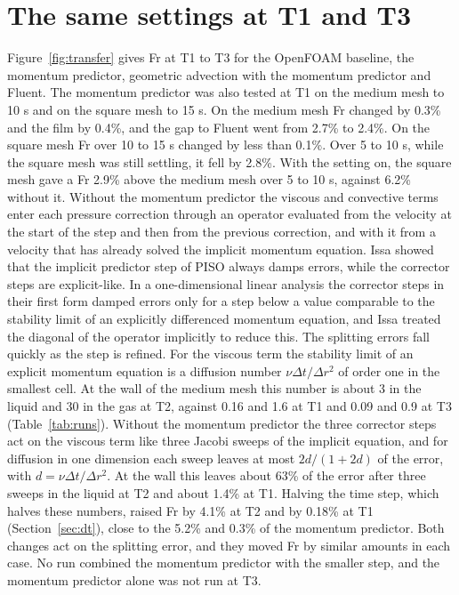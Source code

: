 \documentclass[11pt,a4paper]{article}
\begin{document}
\section{The same settings at T1 and T3}
\label{sec:transfer}

Figure~\ref{fig:transfer} gives Fr at T1 to T3 for the OpenFOAM baseline, the momentum predictor, geometric advection with the momentum predictor and Fluent. The momentum predictor was also tested at T1 on the medium mesh to 10 s and on the square mesh to 15 s. On the medium mesh Fr changed by 0.3\% and the film by 0.4\%, and the gap to Fluent went from 2.7\% to 2.4\%. On the square mesh Fr over 10 to 15 s changed by less than 0.1\%. Over 5 to 10 s, while the square mesh was still settling, it fell by 2.8\%. With the setting on, the square mesh gave a Fr 2.9\% above the medium mesh over 5 to 10 s, against 6.2\% without it. Without the momentum predictor the viscous and convective terms enter each pressure correction through an operator evaluated from the velocity at the start of the step and then from the previous correction, and with it from a velocity that has already solved the implicit momentum equation. Issa \cite{issa1986solution} showed that the implicit predictor step of PISO always damps errors, while the corrector steps are explicit-like. In a one-dimensional linear analysis the corrector steps in their first form damped errors only for a step below a value comparable to the stability limit of an explicitly differenced momentum equation, and Issa treated the diagonal of the operator implicitly to reduce this. The splitting errors fall quickly as the step is refined. For the viscous term the stability limit of an explicit momentum equation is a diffusion number $\nu\Delta t/\Delta r^2$ of order one in the smallest cell. At the wall of the medium mesh this number is about 3 in the liquid and 30 in the gas at T2, against 0.16 and 1.6 at T1 and 0.09 and 0.9 at T3 (Table~\ref{tab:runs}). Without the momentum predictor the three corrector steps act on the viscous term like three Jacobi sweeps of the implicit equation, and for diffusion in one dimension each sweep leaves at most $2d/(1+2d)$ of the error, with $d = \nu\Delta t/\Delta r^2$. At the wall this leaves about 63\% of the error after three sweeps in the liquid at T2 and about 1.4\% at T1. Halving the time step, which halves these numbers, raised Fr by 4.1\% at T2 and by 0.18\% at T1 (Section~\ref{sec:dt}), close to the 5.2\% and 0.3\% of the momentum predictor. Both changes act on the splitting error, and they moved Fr by similar amounts in each case. No run combined the momentum predictor with the smaller step, and the momentum predictor alone was not run at T3.
\end{document}
